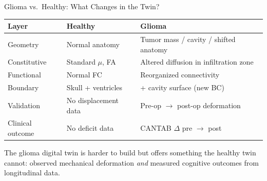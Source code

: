 \begin{frame}{Glioma vs.\ Healthy: What Changes in the Twin?}

  \begin{tabular}{lll}
    \toprule
    \textbf{Layer} & \textbf{Healthy} & \textbf{Glioma} \\
    \midrule
    Geometry & Normal anatomy &
      Tumor mass / cavity / shifted anatomy \\
    Constitutive & Standard $\mu$, FA &
      Altered diffusion in infiltration zone \\
    Functional & Normal FC &
      Reorganized connectivity \\
    Boundary & Skull + ventricles &
      + cavity surface (new BC) \\
    Validation & No displacement data &
      \alert{Pre-op $\to$ post-op deformation} \\
    Clinical outcome & No deficit data &
      \alert{CANTAB $\Delta$ pre $\to$ post} \\
    \bottomrule
  \end{tabular}

  \bigskip

  The glioma digital twin is harder to build but offers something
  the healthy twin cannot: \alert{observed mechanical deformation}
  \emph{and} \alert{measured cognitive outcomes} from longitudinal data.

\end{frame}

